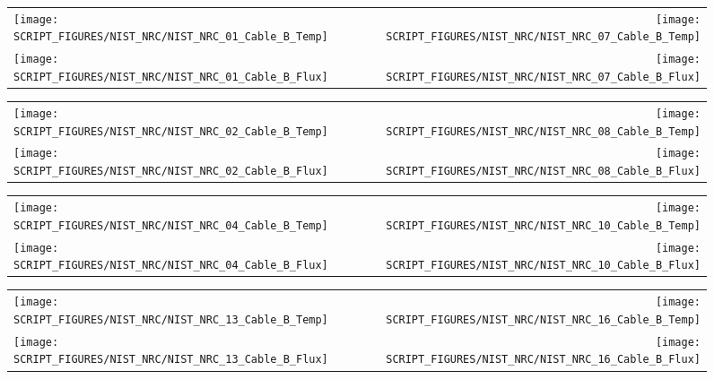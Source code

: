 \clearpage

\begin{figure}[p]
\begin{tabular*}{\textwidth}{l@{\extracolsep{\fill}}r}
\texttt{[image: SCRIPT\_FIGURES/NIST\_NRC/NIST\_NRC\_01\_Cable\_B\_Temp]} &
\texttt{[image: SCRIPT\_FIGURES/NIST\_NRC/NIST\_NRC\_07\_Cable\_B\_Temp]} \\
\texttt{[image: SCRIPT\_FIGURES/NIST\_NRC/NIST\_NRC\_01\_Cable\_B\_Flux]} &
\texttt{[image: SCRIPT\_FIGURES/NIST\_NRC/NIST\_NRC\_07\_Cable\_B\_Flux]}
\end{tabular*}
\label{NIST_NRC_B_1_and_7}
\end{figure}

\begin{figure}[p]
\begin{tabular*}{\textwidth}{l@{\extracolsep{\fill}}r}
\texttt{[image: SCRIPT\_FIGURES/NIST\_NRC/NIST\_NRC\_02\_Cable\_B\_Temp]} &
\texttt{[image: SCRIPT\_FIGURES/NIST\_NRC/NIST\_NRC\_08\_Cable\_B\_Temp]} \\
\texttt{[image: SCRIPT\_FIGURES/NIST\_NRC/NIST\_NRC\_02\_Cable\_B\_Flux]} &
\texttt{[image: SCRIPT\_FIGURES/NIST\_NRC/NIST\_NRC\_08\_Cable\_B\_Flux]}
\end{tabular*}
\label{NIST_NRC_B_2_and_8}
\end{figure}

\clearpage

\begin{figure}[p]
\begin{tabular*}{\textwidth}{l@{\extracolsep{\fill}}r}
\texttt{[image: SCRIPT\_FIGURES/NIST\_NRC/NIST\_NRC\_04\_Cable\_B\_Temp]} &
\texttt{[image: SCRIPT\_FIGURES/NIST\_NRC/NIST\_NRC\_10\_Cable\_B\_Temp]} \\
\texttt{[image: SCRIPT\_FIGURES/NIST\_NRC/NIST\_NRC\_04\_Cable\_B\_Flux]} &
\texttt{[image: SCRIPT\_FIGURES/NIST\_NRC/NIST\_NRC\_10\_Cable\_B\_Flux]}
\end{tabular*}
\label{NIST_NRC_B_4_and_10}
\end{figure}

\begin{figure}[p]
\begin{tabular*}{\textwidth}{l@{\extracolsep{\fill}}r}
\texttt{[image: SCRIPT\_FIGURES/NIST\_NRC/NIST\_NRC\_13\_Cable\_B\_Temp]} &
\texttt{[image: SCRIPT\_FIGURES/NIST\_NRC/NIST\_NRC\_16\_Cable\_B\_Temp]} \\
\texttt{[image: SCRIPT\_FIGURES/NIST\_NRC/NIST\_NRC\_13\_Cable\_B\_Flux]} &
\texttt{[image: SCRIPT\_FIGURES/NIST\_NRC/NIST\_NRC\_16\_Cable\_B\_Flux]}
\end{tabular*}
\label{NIST_NRC_B_13_and_16}
\end{figure}


